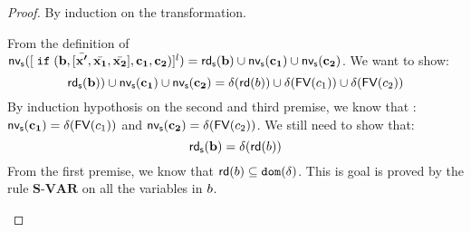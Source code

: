 \documentclass[a4paper,11pt]{article}
\begin{document}
\begin{proof}
 By induction on the transformation.
 \begin{itemize}
From the definition of $\mathsf{nv_s} ([\;\mathtt{if}\;(\boldsymbol{\mathbf{b}}, [\bar{\boldsymbol{\mathbf{x'}}}, \bar{\boldsymbol{\mathbf{x_1}}}, \bar{\boldsymbol{\mathbf{x_2}}}] , \boldsymbol{\mathbf{c_1}}, \boldsymbol{\mathbf{c_2}})]^l) = \mathsf{rd_s} (\boldsymbol{\mathbf{b}}) \cup \mathsf{nv_s} (\boldsymbol{\mathbf{c_1}}) \cup \mathsf{nv_s} (\boldsymbol{\mathbf{c_2}})$. We want to show: \[\mathsf{rd_s} (\boldsymbol{\mathbf{b}})) \cup \mathsf{nv_s} (\boldsymbol{\mathbf{c_1}}) \cup \mathsf{nv_s} (\boldsymbol{\mathbf{c_2}}) = \delta( \mathsf{rd} (b)) \cup \delta(\mathsf{FV} (c_1)) \cup \delta(\mathsf{FV} (c_2)  )\]
By induction hypothosis on the second and third premise, we know that : $\mathsf{nv_s} (\boldsymbol{\mathbf{c_1}}) = \delta(\mathsf{FV} (c_1)) $ and $\mathsf{nv_s} (\boldsymbol{\mathbf{c_2}}) = \delta(\mathsf{FV} (c_2)) $.  We still need to show that: 
\[
  \mathsf{rd_s} (\boldsymbol{\mathbf{b}}) = \delta(\mathsf{rd} (b))
\] 
From the first premise, we know that $\mathsf{rd} (b) \subseteq \mathtt{dom}(\delta)$. This is goal is proved by the rule $\textbf{S-VAR}$ on all the variables in $b$.\\
{}
\end{itemize}
\end{proof}
\end{document}
